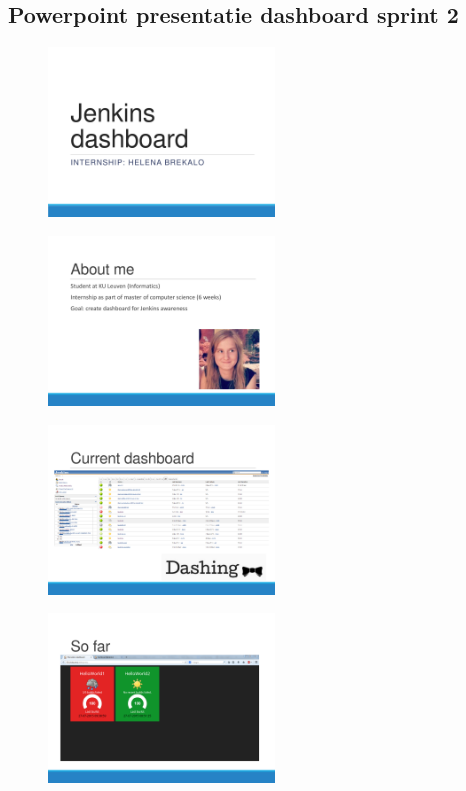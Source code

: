 \documentclass[10pt,a4paper]{article}
\begin{document}
\begin{appendices}
\clearpage

\section{Powerpoint presentatie dashboard sprint 2}
\label{ppt}
\begin{figure}
\centering
\begin{minipage}{0.45\textwidth}
\centering
\includegraphics[width=60mm]{ppt1.pdf}
\label{standup}
\end{minipage}\hfill
\begin{minipage}{0.45\textwidth}
\centering
\includegraphics[width=60mm]{ppt2.pdf}
\label{jira}
\end{minipage}
\end{figure}

\begin{figure}
\centering
\begin{minipage}{0.45\textwidth}
\centering
\includegraphics[width=60mm]{ppt3.pdf}
\label{standup}
\end{minipage}\hfill
\begin{minipage}{0.45\textwidth}
\centering
\includegraphics[width=60mm]{ppt4.pdf}
\label{jira}
\end{minipage}
\end{figure}


\end{appendices}
\end{document}
